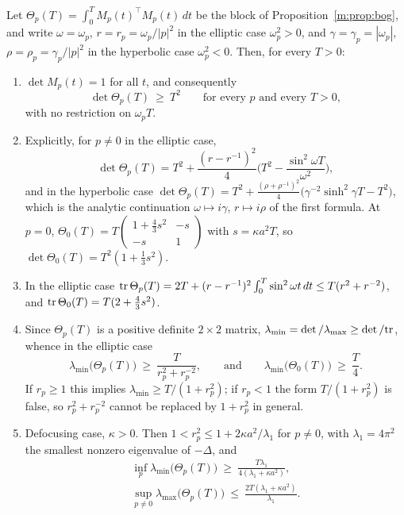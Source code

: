\begin{lemma}\label{m:lem:bogmin}
Let $\Theta_p(T)=\int_0^TM_p(t)^\top M_p(t)\,dt$ be the block of Proposition~\ref{m:prop:bog}, and write $\omega=\omega_p$, $r=r_p=\omega_p/|p|^2$ in the elliptic case $\omega_p^2>0$, and $\gamma=\gamma_p=|\omega_p|$, $\rho=\rho_p=\gamma_p/|p|^2$ in the hyperbolic case $\omega_p^2<0$. Then, for every $T>0$:
\begin{enumerate}[label=(\roman*),nosep,leftmargin=2.2em]
\item $\det M_p(t)=1$ for all $t$, and consequently
\[
\det\Theta_p(T)\ \ge\ T^2\qquad\text{for every }p\text{ and every }T>0,
\]
with no restriction on $\omega_pT$.
\item Explicitly, for $p\ne0$ in the elliptic case,
\[
\det\Theta_p(T)=T^2+\frac{(r-r^{-1})^2}{4}\Big(T^2-\frac{\sin^2\omega T}{\omega^2}\Big),
\]
and in the hyperbolic case $\det\Theta_p(T)=T^2+\frac{(\rho+\rho^{-1})^2}{4}\big(\gamma^{-2}\sinh^2\gamma T-T^2\big)$, which is the analytic continuation $\omega\mapsto i\gamma$, $r\mapsto i\rho$ of the first formula. At $p=0$, $\Theta_0(T)=T\left(\begin{smallmatrix}1+\frac43s^2&-s\\-s&1\end{smallmatrix}\right)$ with $s=\kappa a^2T$, so $\det\Theta_0(T)=T^2(1+\tfrac13s^2)$.
\item In the elliptic case $\mathrm{tr}\,\Theta_p(T)=2T+(r-r^{-1})^2\int_0^T\sin^2\omega t\,dt\le T(r^2+r^{-2})$, and $\mathrm{tr}\,\Theta_0(T)=T(2+\tfrac43s^2)$.
\item Since $\Theta_p(T)$ is a positive definite $2\times2$ matrix, $\lambda_{\min}=\det/\lambda_{\max}\ge\det/\mathrm{tr}$, whence in the elliptic case
\[
\lambda_{\min}\big(\Theta_p(T)\big)\ \ge\ \frac{T}{r_p^2+r_p^{-2}},\qquad\text{and}\qquad \lambda_{\min}\big(\Theta_0(T)\big)\ \ge\ \frac T4 .
\]
If $r_p\ge1$ this implies $\lambda_{\min}\ge T/(1+r_p^2)$; if $r_p<1$ the form $T/(1+r_p^2)$ is false, so $r_p^2+r_p^{-2}$ cannot be replaced by $1+r_p^2$ in general.
\item Defocusing case, $\kappa>0$. Then $1<r_p^2\le1+2\kappa a^2/\lambda_1$ for $p\ne0$, with $\lambda_1=4\pi^2$ the smallest nonzero eigenvalue of $-\Delta$, and
\[
\begin{gathered}
\inf_p\lambda_{\min}\big(\Theta_p(T)\big)\ \ge\ \frac{T\lambda_1}{4(\lambda_1+\kappa a^2)},\\
\sup_{p\ne0}\lambda_{\max}\big(\Theta_p(T)\big)\ \le\ \frac{2T(\lambda_1+\kappa a^2)}{\lambda_1}.

\end{gathered}\]
\end{enumerate}
\end{lemma}
